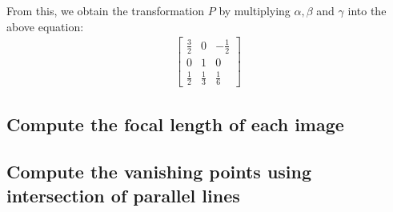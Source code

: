 \documentclass[12pt, oneside]{article}
\begin{document}
  From this, we obtain the transformation $P$ by multiplying $\alpha, \beta$ and $\gamma$ into the above equation:
  \begin{align*}
  \begin{bmatrix}
  \frac{3}{2} & 0 & -\frac{1}{2}	\\
  0 & 1 & 0		\\
  \frac{1}{2}  & \frac{1}{3}  & \frac{1}{6}	
  \end{bmatrix}
  \end{align*}
  
\subsection{Compute the focal length of each image}
\subsection{Compute the vanishing points using intersection of parallel lines}
\end{document}
